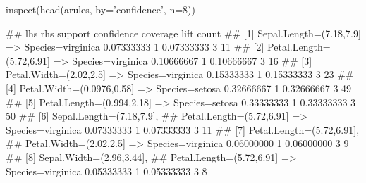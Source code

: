 \documentclass{article}\usepackage[]{graphicx}\usepackage[]{color}
\begin{document}
\begin{Schunk}
% --begin: "casestudy-assoc-arules-view"
\begin{Sinput}
inspect(head(arules, by='confidence', n=8))
\end{Sinput}
\begin{Soutput}
##     lhs                            rhs                    support confidence   coverage lift count
## [1] {Sepal.Length=(7.18,7.9]}   => {Species=virginica} 0.07333333          1 0.07333333    3    11
## [2] {Petal.Length=(5.72,6.91]}  => {Species=virginica} 0.10666667          1 0.10666667    3    16
## [3] {Petal.Width=(2.02,2.5]}    => {Species=virginica} 0.15333333          1 0.15333333    3    23
## [4] {Petal.Width=(0.0976,0.58]} => {Species=setosa}    0.32666667          1 0.32666667    3    49
## [5] {Petal.Length=(0.994,2.18]} => {Species=setosa}    0.33333333          1 0.33333333    3    50
## [6] {Sepal.Length=(7.18,7.9],                                                                     
##      Petal.Length=(5.72,6.91]}  => {Species=virginica} 0.07333333          1 0.07333333    3    11
## [7] {Petal.Length=(5.72,6.91],                                                                    
##      Petal.Width=(2.02,2.5]}    => {Species=virginica} 0.06000000          1 0.06000000    3     9
## [8] {Sepal.Width=(2.96,3.44],                                                                     
##      Petal.Length=(5.72,6.91]}  => {Species=virginica} 0.05333333          1 0.05333333    3     8
\end{Soutput}
%
% --end: "casestudy-assoc-arules-view"
\end{Schunk}
\end{document}
